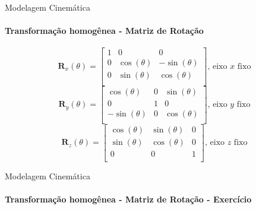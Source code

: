 \documentclass{beamer}
\begin{document}
\begin{frame}{Modelagem Cinemática}
    \framesubtitle{Transformação homogênea - Matriz de Rotação}
    \begin{block}{}
        \begin{equation*}
            \mathbf{R}_x(\theta) = 
            \begin{bmatrix}
            1 & 0 & 0\\
            0 & \cos(\theta) & -\sin(\theta)\\
            0 & \sin(\theta) & \cos(\theta)\\ 
            \end{bmatrix} \text{, eixo $x$ fixo}
        \end{equation*}
        \begin{equation*}
            \mathbf{R}_y(\theta) = 
            \begin{bmatrix}
            \cos(\theta) & 0 & \sin(\theta) \\
            0 & 1 & 0\\
            -\sin(\theta)  & 0 & \cos(\theta)\\ 
            \end{bmatrix} \text{, eixo $y$ fixo}
        \end{equation*}
        \begin{equation*}
            \mathbf{R}_z(\theta) = 
            \begin{bmatrix}
            \cos(\theta) & \sin(\theta) & 0\\
            \sin(\theta) & \cos(\theta) & 0\\
            0 & 0 & 1\\ 
            \end{bmatrix} \text{, eixo $z$ fixo}
        \end{equation*}
    \end{block}
  \end{frame}

  \begin{frame}{Modelagem Cinemática}
    \framesubtitle{Transformação homogênea - Matriz de Rotação - Exercício}
\end{frame}
\end{document}
